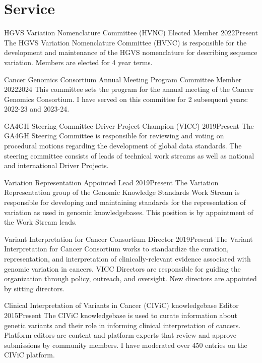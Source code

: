 \documentclass[10pt]{article} %
\begin{document}

\section{Service}

\cmte
{HGVS Variation Nomenclature Committee (HVNC)}
{Elected Member}
{2022}{Present}
{The HGVS Variation Nomenclature Committee (HVNC) is responsible for the development
and maintenance of the HGVS nomenclature for describing sequence variation.
Members are elected for 4 year terms.}

 \cmte
{Cancer Genomics Consortium Annual Meeting Program Committee}
{Member}
{2022}{2024}
{This committee sets the program for the annual meeting of the Cancer Genomics Consortium. I have served on this
committee for 2 subsequent years: 2022-23 and 2023-24.}

\cmte
{GA4GH Steering Committee}
{Driver Project Champion (VICC)}
{2019}{Present}
{The GA4GH Steering Committee is responsible for reviewing and voting on procedural motions
regarding the development of global data standards. The steering committee consists of leads
of technical work streams as well as national and international Driver Projects.}

\cmte
{Variation Representation}
{Appointed Lead}
{2019}{Present}
{The Variation Representation group of the Genomic Knowledge Standards Work Stream is
 responsible for developing and maintaining standards for the representation of variation as used
 in genomic knowledgebases. This position is by appointment of the Work Stream leads.}

\cmte
{Variant Interpretation for Cancer Consortium}
{Director}
{2019}{Present}
{The Variant Interpretation for Cancer Consortium works to standardize the curation, 
representation, and interpretation of clinically-relevant evidence associated with genomic variation
 in cancers. VICC Directors are responsible for guiding the organization through policy, outreach, and
 oversight. New directors are appointed by sitting directors.}
 
 \cmte
{Clinical Interpretation of Variants in Cancer (CIViC) knowledgebase}
{Editor}
{2015}{Present}
{The CIViC knowledgebase is used to curate information about genetic variants and their role in 
informing clinical interpretation of cancers. Platform editors are content and platform experts that 
review and approve submissions by community members. I have moderated over 450 entries on
the CIViC platform.}
\end{document}
